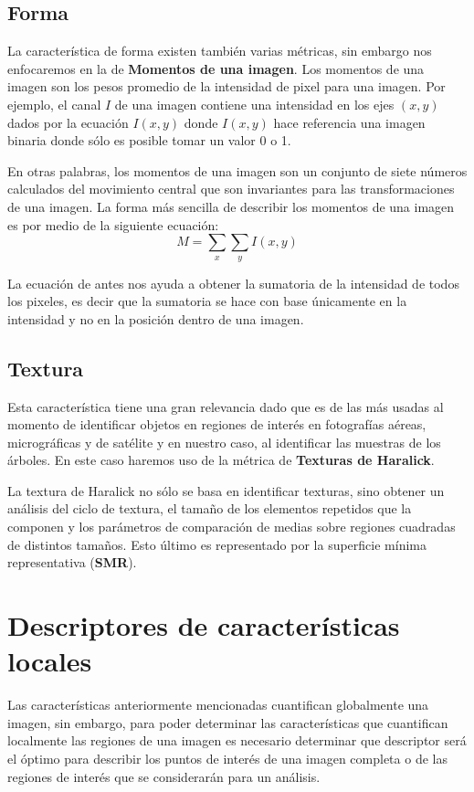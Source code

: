 \subsection{Forma}
La característica de forma existen también varias métricas, sin embargo nos enfocaremos en la de \textbf{Momentos de una imagen}. 
Los momentos de una imagen son los pesos promedio de la intensidad de pixel para una imagen. Por ejemplo, el canal $I$ de una imagen contiene una intensidad en los ejes $(x,y)$ dados por la ecuación $I(x,y)$ donde $I(x,y)$ hace referencia una imagen binaria donde sólo es posible tomar un valor 0 o 1. 

En otras palabras, los momentos de una imagen son un conjunto de siete números calculados del movimiento central que son invariantes para las transformaciones de una imagen. La forma más sencilla de describir los momentos de una imagen es por medio de la siguiente ecuación: \begin{equation}
 M = \sum_{x}\sum_{y} I(x,y) 
\end{equation}

La ecuación de antes nos ayuda a obtener la sumatoria de la intensidad de todos los pixeles, es decir que la sumatoria se hace con base únicamente en la intensidad y no en la posición dentro de una imagen.

\subsection{Textura} 
Esta característica tiene una gran relevancia dado que es de las más usadas al momento de identificar objetos en regiones de interés en fotografías aéreas, micrográficas y de satélite y en nuestro caso, al identificar las muestras de los árboles. En este caso haremos uso de la métrica de \textbf{Texturas de Haralick}.

La textura de Haralick no sólo se basa en identificar texturas, sino obtener un análisis del ciclo de textura, el tamaño de los elementos repetidos que la componen y los parámetros de comparación de medias sobre regiones cuadradas de distintos tamaños. Esto último es representado por la superficie mínima representativa (\textbf{SMR}).

\section{Descriptores de características locales}
Las características anteriormente mencionadas cuantifican globalmente una imagen, sin embargo, para poder determinar las características que cuantifican localmente las regiones de una imagen es necesario determinar que descriptor será el óptimo para describir los puntos de interés de una imagen completa o de las regiones de interés que se considerarán para un análisis. 

